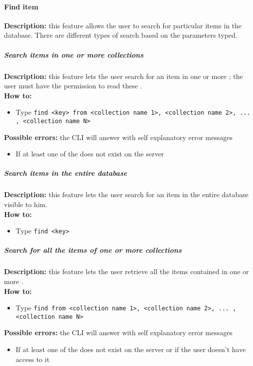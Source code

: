 \documentclass{scalatekids-article}
\begin{document}
\paragraph{Find item}
\label{sec:find}
\textbf{Description:} this feature allows the user to search for particular items in the database. There are different types of search based on the parameters typed.\\

\subparagraph{Search items in one or more collections}
\textbf{Description:} this feature lets the user search for an item in one or more ; the user must have the permission to read these .\\
\textbf{How to:}
\begin{itemize}
\item Type \texttt{find <key> from <collection name 1>, <collection name 2>, ... , <collection name N>}
\end{itemize}
\textbf{Possible errors:} the CLI will answer with self explanatory error messages
\begin{itemize}
\item If at least one of the  does not exist on the server
\end{itemize}

\subparagraph{Search items in the entire database}
\textbf{Description:} this feature lets the user search for an item in the entire database visible to him.\\
\textbf{How to:}
\begin{itemize}
\item Type \texttt{find <key>}
\end{itemize}

\subparagraph{Search for all the items of one or more collections}
\textbf{Description:} this feature lets the user retrieve all the items contained in one or more .\\
\textbf{How to:}
\begin{itemize}
\item Type \texttt{find from <collection name 1>, <collection name 2>, ... , <collection name N>}
\end{itemize}
\textbf{Possible errors:} the CLI will answer with self explanatory error messages
\begin{itemize}
\item If at least one of the  does not exist on the server or if the user doesn't have access to it
\end{itemize}
\end{document}

